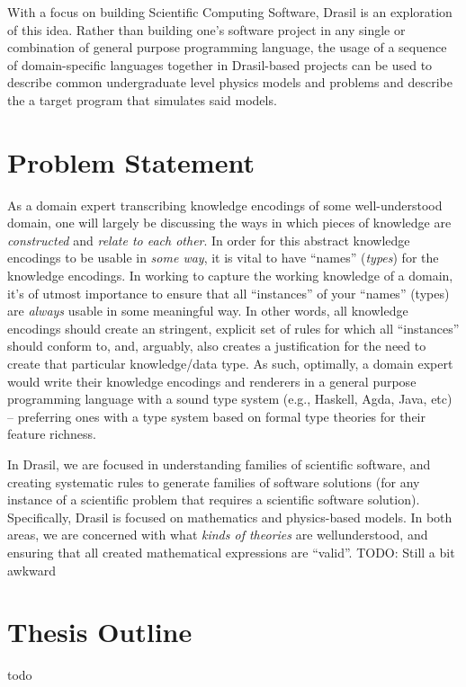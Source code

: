 
With a focus on building Scientific Computing Software, Drasil is an
exploration of this idea. Rather than building one's software project in any
single or combination of general purpose programming language, the usage of a
sequence of domain-specific languages together in Drasil-based projects can be
used to describe common undergraduate level physics models and problems and
describe the a target program that simulates said models.

\section{Problem Statement}


As a domain expert transcribing knowledge encodings of some
well\hyp{}understood domain, one will largely be discussing the ways in which
pieces of knowledge are \textit{constructed} and \textit{relate to each other}.
In order for this abstract knowledge encodings to be usable in \textit{some way},
it is vital to have ``names'' (\textit{types}) for the knowledge encodings. In
working to capture the working knowledge of a domain, it's of utmost importance
to ensure that all ``instances'' of your ``names'' (types) are \textit{always}
usable in some meaningful way. In other words, all knowledge encodings should
create an stringent, explicit set of rules for which all ``instances'' should
conform to, and, arguably, also creates a justification for the need to create
that particular knowledge/data type. As such, optimally, a domain expert would
write their knowledge encodings and renderers in a general purpose programming
language with a sound type system (e.g., Haskell, Agda, Java, etc) -- preferring
ones with a type system based on formal type theories for their feature richness.

In Drasil, we are focused in understanding families of scientific software, and
creating systematic rules to generate families of software solutions (for any
instance of a scientific problem that requires a scientific software solution).
Specifically, Drasil is focused on mathematics and physics-based models. In both
areas, we are concerned with what \textit{kinds of theories} are
well\-understood, and ensuring that all created mathematical expressions are
``valid''. TODO: Still a bit awkward

\section{Thesis Outline}

todo